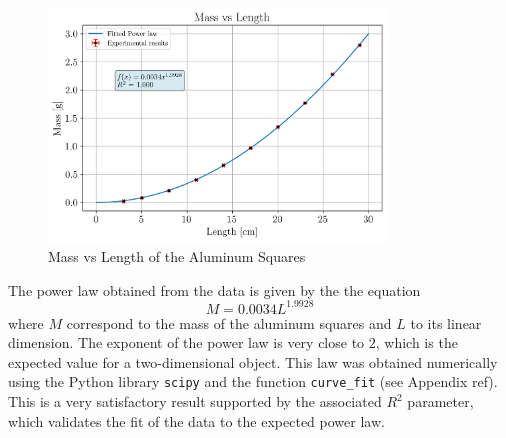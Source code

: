 \documentclass[a4paper,12pt]{article}
\begin{document}
\begin{figure}[h!] 
    \centering
    \includegraphics[width = 0.8\textwidth]{mass_vs_length.png}
    \caption{Mass vs Length of the Aluminum Squares}
    \label{fig:mass_vs_length}
\end{figure}

The power law obtained from the data is given by the the equation
\begin{equation}\label{eq:mass_vs_length}
    M = 0.0034 L^{1.9928}
\end{equation}
where $M$ correspond to the mass of the aluminum squares and $L$ to its linear dimension. The exponent of the power law is very close to $2$, which is the expected 
value for a two-dimensional object. This law was obtained numerically using the Python library \texttt{scipy} and the function \texttt{curve\_fit} (see Appendix ref). 
This is a very satisfactory result supported by the associated $R^2$ parameter, which validates the fit of the data to the expected power law.  
\end{document}
